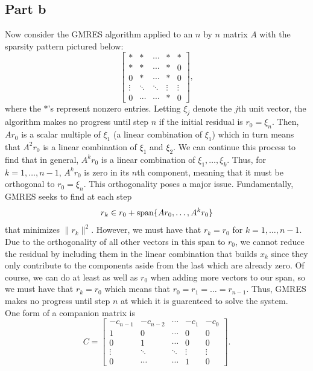 \documentclass{article}
\begin{document}
\subsection{Part b}
Now consider the GMRES algorithm applied to an $n$ by $n$ matrix $A$ with the sparsity pattern 
pictured below:
\[
\left[ \begin{array}{ccccc}
\ast & \ast & \cdots & \ast & \ast \\
\ast & \ast & \cdots & \ast & 0 \\
0    & \ast & \cdots & \ast & 0 \\
\vdots  & \ddots & \ddots & \vdots & \vdots \\
0    & \cdots    & \cdots & \ast & 0 \end{array} \right] ,
\]
where the $\ast$'s represent nonzero entries. Letting $\xi_j$ denote the $j$th unit vector, the algorithm makes no progress until step $n$ if the initial residual is $r_0=\xi_n$. Then, $Ar_0$ is a scalar multiple of $\xi_1$ (a linear combination of $\xi_1$) which in turn means that $A^2r_0$ is a linear combination of $\xi_1$ and $\xi_2$. We can continue this process to find that in general, $A^{k}r_0$ is a linear combination of $\xi_1,\ldots,\xi_k$. Thus, for $k=1,\ldots,n-1$, $A^{k}r_0$ is zero in its $n$th component, meaning that it must be orthogonal to $r_0=\xi_n$. This orthogonality poses a major issue. Fundamentally, GMRES seeks to find at each step
\[
r_k\in r_0+\operatorname{span}\{Ar_0,\ldots,A^{k}r_0\}
\]
that minimizes $\|r_k\|^2$. However, we must have that $r_k=r_0$ for $k=1,\ldots,n-1$. Due to the orthogonality of all other vectors in this span to $r_0$, we cannot reduce the residual by including them in the linear combination that builds $x_k$ since they only contribute to the components aside from the last which are already zero. Of course, we can do at least as well as $r_0$ when adding more vectors to our span, so we must have that $r_k=r_0$ which means that $r_0=r_1=\ldots=r_{n-1}$. Thus, GMRES makes no progress until step $n$ at which it is guarenteed to solve the system.  \\
One form of a companion matrix is
\[
C=\left[ \begin{array}{ccccc}
-c_{n-1} & -c_{n-2} & \cdots & -c_{1} & -c_{0} \\
1 & 0 & \cdots & 0 & 0 \\
0    & 1 & \cdots & 0 & 0 \\
\vdots  & \ddots & \ddots & \vdots & \vdots \\
0    & \cdots    & \cdots & 1 & 0 \end{array} \right].
\]
\end{document}
